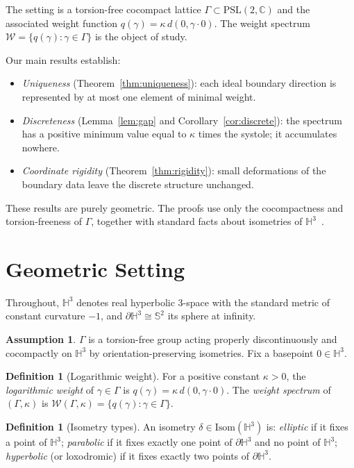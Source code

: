 \documentclass[12pt]{article}
\theoremstyle{definition}
\newtheorem{definition}[theorem]{Definition}
\newtheorem{assumption}[theorem]{Assumption}
\theoremstyle{remark}
\begin{document}
The setting is a torsion-free cocompact lattice
$\Gamma\subset\mathrm{PSL}(2,\mathbb{C})$ and the associated weight
function $q(\gamma)=\kappa\,d(0,\gamma\cdot0)$. The weight spectrum
$\mathcal{W}=\{q(\gamma):\gamma\in\Gamma\}$ is the object of study.

Our main results establish:
\begin{itemize}
\item \emph{Uniqueness} (Theorem~\ref{thm:uniqueness}): each ideal
      boundary direction is represented by at most one element of minimal
      weight.
\item \emph{Discreteness} (Lemma~\ref{lem:gap} and
      Corollary~\ref{cor:discrete}): the spectrum has a positive minimum
      value equal to $\kappa$ times the systole; it accumulates nowhere.
\item \emph{Coordinate rigidity} (Theorem~\ref{thm:rigidity}): small
      deformations of the boundary data leave the discrete structure
      unchanged.
\end{itemize}

These results are purely geometric. The proofs use only the cocompactness
and torsion-freeness of $\Gamma$, together with standard facts about
isometries of $\mathbb{H}^3$~\cite{ratcliffe,maskit,bridsonhaefliger}.

\section{Geometric Setting}

Throughout, $\mathbb{H}^3$ denotes real hyperbolic 3-space with the
standard metric of constant curvature $-1$, and
$\partial\mathbb{H}^3\cong\mathbb{S}^2$ its sphere at infinity.

\begin{assumption}\label{ass:action}
$\Gamma$ is a torsion-free group acting properly discontinuously and
cocompactly on $\mathbb{H}^3$ by orientation-preserving isometries.
Fix a basepoint $0\in\mathbb{H}^3$.
\end{assumption}

\begin{definition}[Logarithmic weight]\label{def:weight}
For a positive constant $\kappa>0$, the \emph{logarithmic weight} of
$\gamma\in\Gamma$ is $q(\gamma)=\kappa\,d(0,\gamma\cdot0)$.
The \emph{weight spectrum} of $(\Gamma,\kappa)$ is
$\mathcal{W}(\Gamma,\kappa)=\{q(\gamma):\gamma\in\Gamma\}$.
\end{definition}

\begin{definition}[Isometry types]\label{def:types}
An isometry $\delta\in\mathrm{Isom}(\mathbb{H}^3)$ is:
\emph{elliptic} if it fixes a point of $\mathbb{H}^3$;
\emph{parabolic} if it fixes exactly one point of $\partial\mathbb{H}^3$
and no point of $\mathbb{H}^3$;
\emph{hyperbolic} (or loxodromic) if it fixes exactly two points
of $\partial\mathbb{H}^3$.
\end{definition}
\end{document}
